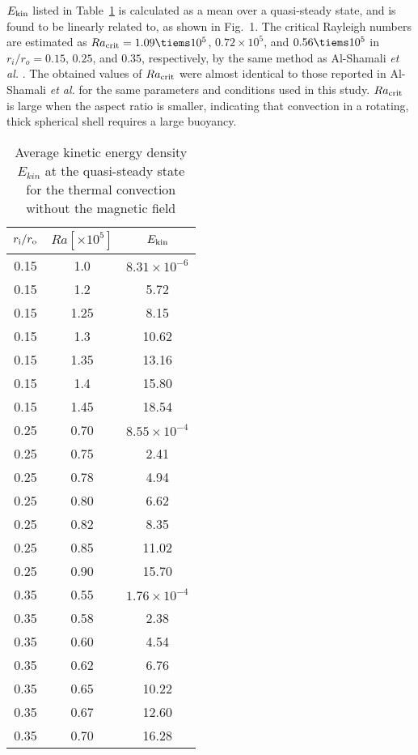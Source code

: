 $E_{\rm kin}$ listed in Table~\ref{table:Rac} is calculated as a mean over a quasi-steady state, and is found to be linearly related to, as shown in Fig.~1.
The critical Rayleigh numbers are estimated as $Ra_{\rm crit} = 1.09 \tiems 10^5$, $0.72 \times 10^5$, and $0.56 \tiems 10^5$ in $r_i/r_o = 0.15$, $0.25$, and $0.35$, respectively, by the same method as Al-Shamali {\it et al.} . 
The obtained values of $Ra_{\rm crit}$ were almost identical to those reported in Al-Shamali {\it et al.}  for the same parameters and conditions used in this study. 
$Ra_{\rm crit}$ is large when the aspect ratio is smaller, indicating that convection in a rotating, thick spherical shell requires a large buoyancy.
%
%
\begin{table}
\caption{Average kinetic energy density $E_{kin}$ at the quasi-steady state \\
for the thermal convection without the magnetic field}
\begin{center}
\begin{tabular}{|ccc||}
   \hline
  $r_{\rm i}/r_{\rm o}$ & $Ra[\times 10^5] $ &  $E_{\rm kin}$ \\
    \hline \hline
 0.15  &  1.0  &  $8.31 \times 10^{-6}$ \\
 0.15  &  1.2  &  5.72 \\
 0.15  &  1.25 &  8.15 \\
 0.15  &  1.3  &  10.62 \\
 0.15  &  1.35 &  13.16 \\
 0.15  &  1.4  &  15.80 \\
 0.15  &  1.45  &  18.54 \\
 \hline
%
 0.25  &  0.70 &  $8.55 \times 10^{-4}$ \\
 0.25  &  0.75 &  2.41 \\
 0.25  &  0.78  &  4.94 \\
 0.25  &  0.80  &  6.62 \\
 0.25  &  0.82  & 8.35 \\
 0.25  &  0.85  &  11.02 \\
 0.25  &  0.90  &  15.70 \\
 \hline
%
 0.35  &  0.55  &  $1.76 \times 10^{-4}$ \\
 0.35  &  0.58  &  2.38  \\
 0.35  &  0.60  &  4.54  \\
 0.35  &  0.62  &  6.76 \\
 0.35  &  0.65  &  10.22 \\
 0.35  &  0.67  &  12.60\\
 0.35  &  0.70  &  16.28 \\
 \hline
 \hline
\end{tabular}
\end{center}
\label{table:Rac}
\end{table}
%
